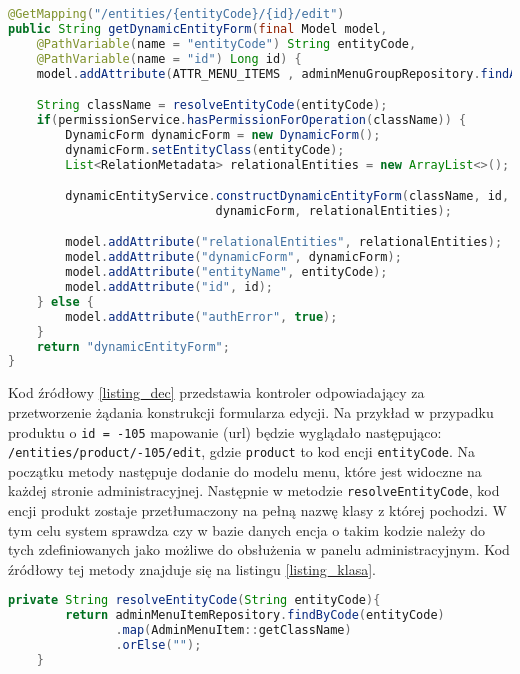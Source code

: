 \begin{small}
\begin{lstlisting}[language=Java, frame=lines, numberstyle=\tiny, stepnumber=5, caption=Przetworzenie zapytania żądania edycji encji \texttt{DynamicEntityController.java}\label{listing_dec}., firstnumber=1]
@GetMapping("/entities/{entityCode}/{id}/edit")
public String getDynamicEntityForm(final Model model, 
    @PathVariable(name = "entityCode") String entityCode,
    @PathVariable(name = "id") Long id) {
    model.addAttribute(ATTR_MENU_ITEMS , adminMenuGroupRepository.findAll());

    String className = resolveEntityCode(entityCode);
    if(permissionService.hasPermissionForOperation(className)) {
        DynamicForm dynamicForm = new DynamicForm();
        dynamicForm.setEntityClass(entityCode);
        List<RelationMetadata> relationalEntities = new ArrayList<>();

        dynamicEntityService.constructDynamicEntityForm(className, id,
                             dynamicForm, relationalEntities);

        model.addAttribute("relationalEntities", relationalEntities);
        model.addAttribute("dynamicForm", dynamicForm);
        model.addAttribute("entityName", entityCode);
        model.addAttribute("id", id);
    } else {
        model.addAttribute("authError", true);
    }
    return "dynamicEntityForm";
}
\end{lstlisting} 
\end{small}

Kod źródłowy \ref{listing_dec} przedstawia kontroler odpowiadający za przetworzenie żądania konstrukcji formularza edycji. Na przykład w przypadku produktu o \texttt{id = -105} mapowanie (url) będzie wyglądało następująco: \texttt{/entities/product/-105/edit}, gdzie \texttt{product} to kod encji \texttt{entityCode}. Na początku metody następuje dodanie do modelu menu, które jest widoczne na każdej stronie administracyjnej. Następnie w metodzie \texttt{resolveEntityCode}, kod encji produkt zostaje przetłumaczony na pełną nazwę klasy z której pochodzi. W tym celu system sprawdza czy w bazie danych encja o takim kodzie należy do tych zdefiniowanych jako możliwe do obsłużenia w panelu administracyjnym. Kod źródłowy tej metody znajduje się na listingu \ref{listing_klasa}. 
\begin{small}
	\begin{lstlisting}[language=Java, frame=lines, numberstyle=\tiny, stepnumber=5, caption=Zamiana kodu encji na nazwę klasy: \texttt{DynamicEntityController.java}\label{listing_klasa}., firstnumber=1]
	private String resolveEntityCode(String entityCode){
	    return adminMenuItemRepository.findByCode(entityCode)
	           .map(AdminMenuItem::getClassName)
	           .orElse("");
	}
	\end{lstlisting} 
\end{small}

